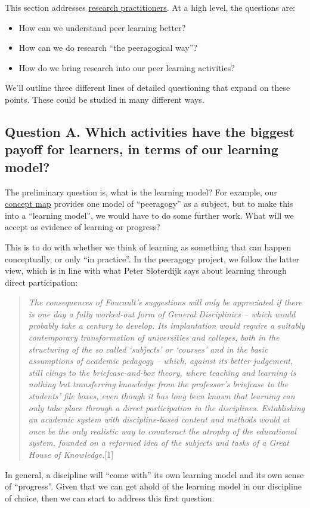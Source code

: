 This section addresses
\href{http://edfutures.net/index.php?title=Practitioner\_Research}{research
practitioners}. At a high level, the questions are:

\begin{itemize}
\item
  How can we understand peer learning better?
\item
  How can we do research ``the peeragogical way''?
\item
  How do we bring research into our peer learning activities?
\end{itemize}
We'll outline three different lines of detailed questioning that expand
on these points. These could be studied in many different ways.

\subsection{Question A. Which activities have the biggest payoff for
learners, in terms of our learning model?}

The preliminary question is, what is the learning model? For example,
our
\href{http://cmapspublic3.ihmc.us/rid=1K81VLSK7-1RL0RQ4-WZK/Peeragogy\%20Cmap.cmap}{concept
map} provides one model of ``peeragogy'' as a subject, but to make this
into a ``learning model'', we would have to do some further work. What
will we accept as evidence of learning or progress?

This is to do with whether we think of learning as something that can
happen conceptually, or only ``in practice''. In the peeragogy project,
we follow the latter view, which is in line with what Peter Sloterdijk
says about learning through direct participation:

\begin{quote}
\emph{The consequences of Foucault's suggestions will only be
appreciated if there is one day a fully worked-out form of General
Disciplinics -- which would probably take a century to develop. Its
implantation would require a suitably contemporary transformation of
universities and colleges, both in the structuring of the so called
`subjects' or `courses' and in the basic assumptions of academic
pedagogy -- which, against its better judgement, still clings to the
briefcase-and-box theory, where teaching and learning is nothing but
transferring knowledge from the professor's briefcase to the students'
file boxes, even though it has long been known that learning can only
take place through a direct participation in the disciplines.
Establishing an academic system with discipline-based content and
methods would at once be the only realistic way to counteract the
atrophy of the educational system, founded on a reformed idea of the
subjects and tasks of a Great House of Knowledge.}{[}1{]}\emph{}
\end{quote}
In general, a discipline will ``come with'' its own learning model and
its own sense of ``progress''. Given that we can get ahold of the
learning model in our discipline of choice, then we can start to address
this first question.

